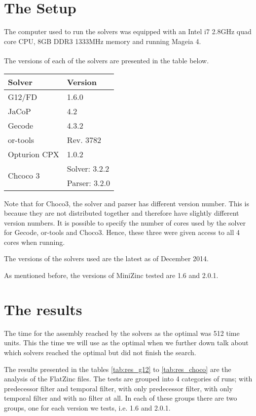\section{The Setup}
The computer used to run the solvers was equipped with an Intel i7 2.8GHz quad core CPU, 8GB DDR3 1333MHz memory and running Mageia 4.
\\\\
The versions of each of the solvers are presented in the table below.
\begin{table}[h]
\centering
\begin{tabular}{l|l}
Solver                    & Version \\ \hline
G12/FD                    & 1.6.0\\
JaCoP                     & 4.2 \\
Gecode                    & 4.3.2 \\
or-tools                  & Rev. 3782 \\
Opturion CPX              & 1.0.2 \\
\multirow{2}{*}{Chcoco 3} & Solver: 3.2.2 \\
                          & Parser: 3.2.0
\end{tabular}
\end{table}
Note that for Choco3, the solver and parser has different version number. This is because they are not distributed together and therefore have slightly different version numbers. It is possible to specify the number of cores used by the solver for Gecode, or-tools and Choco3. Hence, these three were given access to all 4 cores when running.

The versions of the solvers used are the latest as of December 2014.

As mentioned before, the versions of MiniZinc tested are 1.6 and 2.0.1.

\section{The results}\label{sec:res}
The time for the assembly reached by the solvers as the optimal was 512 time units. This the time we will use as the optimal when we further down talk about which solvers reached the optimal but did not finish the search.

The results presented in the tables \ref{tab:res_g12} to \ref{tab:res_choco} are the analysis of the FlatZinc files. The tests are grouped into 4 categories of runs; with predecessor filter and temporal filter, with only predecessor filter, with only temporal filter and with no filter at all. In each of these groups there are two groups, one for each version we tests, i.e. 1.6 and 2.0.1.

